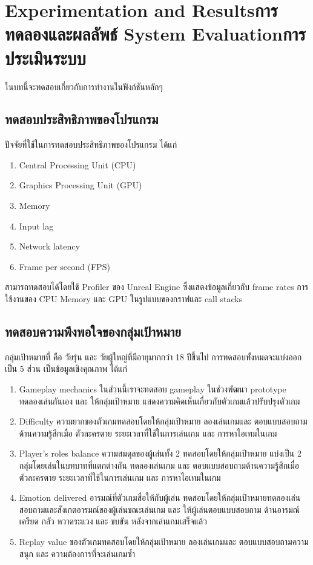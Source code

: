 \chapter{\ifproject%
\ifenglish Experimentation and Results\else การทดลองและผลลัพธ์\fi
\else%
\ifenglish System Evaluation\else การประเมินระบบ\fi
\fi}

ในบทนี้จะทดสอบเกี่ยวกับการทำงานในฟังก์ชันหลักๆ

\section{ทดสอบประสิทธิภาพของโปรแกรม}

ปัจจัยที่ใช้ในการทดสอบประสิทธิภาพของโปรแกรม ได้แก่
\begin{enumerate}
    \item Central Processing Unit (CPU)
    \item Graphics Processing Unit (GPU)
    \item Memory
    \item Input lag
    \item Network latency
    \item Frame per second (FPS)
\end{enumerate}

สามารถทดสอบได้โดยใช้ Profiler ของ Unreal Engine ซึ่งแสดงข้อมูลเกี่ยวกับ frame rates การใช้งานของ CPU Memory และ GPU ในรูปแบบของกราฟและ call stacks

\section{ทดสอบความพึงพอใจของกลุ่มเป้าหมาย}

กลุ่มเป้าหมายที่ คือ วัยรุ่น และ วัยผู้ใหญ่ที่มีอายุมากกว่า 18 ปีขึ้นไป การทดสอบทั้งหมดจะแบ่งออกเป็น 5 ส่วน เป็นข้อมูลเชิงคุณภาพ ได้แก่
\begin{enumerate}
    \item Gameplay mechanics ในส่วนนี้เราจะทดสอบ gameplay ในช่วงพัฒนา prototype ทดลองเล่นกันเอง และ ให้กลุ่มเป้าหมาย แสดงความคิดเห็นเกี่ยวกับตัวเกมแล้วปรับปรุงตัวเกม
    \item Difficulty ความยากของตัวเกมทดสอบโดยให้กลุ่มเป้าหมาย ลองเล่นเกมและ ตอบแบบสอบถามด้านความรู้สึกเมื่อ ตัวละครตาย ระยะเวลาที่ใช้ในการเล่นเกม และ การหาไอเทมในเกม
    \item Player's roles balance ความสมดุลของผู้เล่นทั้ง 2 ทดสอบโดยให้กลุ่มเป้าหมาย แบ่งเป็น 2 กลุ่มโดยเล่นในบทบาทที่แตกต่างกัน  ทดลองเล่นเกม และ ตอบแบบสอบถามด้านความรู้สึกเมื่อ ตัวละครตาย ระยะเวลาที่ใช้ในการเล่นเกม และ การหาไอเทมในเกม
    \item Emotion delivered อารมณ์ที่ตัวเกมสื่อให้กับผู้เล่น ทดสอบโดยให้กลุ่มเป้าหมายทดลองเล่น สอบถามและสังเกตอารมณ์ของผู้เล่นขณะเล่นเกม และ ให้ผู้เล่นตอบแบบสอบถาม ด้านอารมณ์ เครียด กลัว หวาดระแวง และ ขบขัน หลังจากเล่นเกมเสร็จแล้ว
    \item Replay value ของตัวเกมทดสอบโดยให้กลุ่มเป้าหมาย ลองเล่นเกมและ ตอบแบบสอบถามความสนุก และ ความต้องการที่จะเล่นเกมซ้ำ
\end{enumerate}